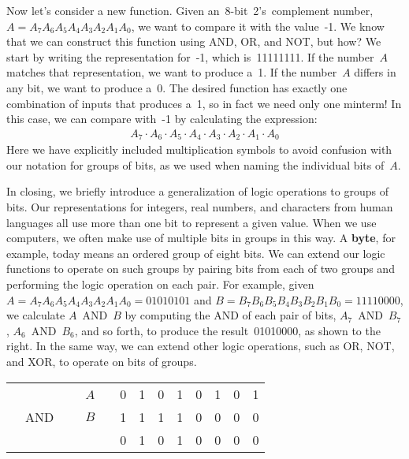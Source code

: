 Now let's consider a new function.  Given
an~\mbox{8-bit}~2's~complement number,~$A=A_7A_6A_5A_4A_3A_2A_1A_0$,
we want to compare it with the value~-1.  We know that
we can construct this function using AND, OR, and NOT, but how?
We start by writing the representation for~-1, which is~11111111.
If the number~$A$ matches that representation, we want to produce a~1.
If the number~$A$ differs in any bit, we want to produce a~0.
The desired function has exactly one combination of inputs that
produces a~1, so in fact we need only one minterm!  In this case, we
can compare with~-1 by calculating the expression:
%
\begin{eqnarray*}
A_7 \cdot A_6 \cdot A_5 \cdot A_4 \cdot A_3 \cdot A_2 \cdot A_1 \cdot A_0
\end{eqnarray*}
%
Here we have explicitly included multiplication symbols to avoid
confusion with our notation for groups of bits, as we used when 
naming the individual bits of~$A$.

\begin{minipage}{5.05in}
In closing, we briefly introduce a generalization of logic
operations to groups of bits.  Our representations for integers,
real numbers, and characters from human languages all use more than
one bit to represent a given value.  When we use computers, we often
make use of multiple bits in groups in this way.  A {\bf byte}, for example,
today means an ordered group of eight bits.
%
We can extend our logic functions to operate on such groups by pairing
bits from each of two groups and performing the logic operation on each
pair.  For example, given
$A=A_7A_6A_5A_4A_3A_2A_1A_0=01010101$
and
$B=B_7B_6B_5B_4B_3B_2B_1B_0=11110000$, we calculate
$A$~AND~$B$ by computing the AND of each pair of bits, 
$A_7$~AND~$B_7$,
$A_6$~AND~$B_6$,
and so forth, to
produce the result~01010000, as shown to the right.
In the same way, we can extend other logic
operations, such as OR, NOT, and XOR, to operate on bits of groups.
\end{minipage}\hspace{.25in}%
\begin{minipage}{1.2in}
{\arraycolsep 0pt
\tabcolsep 0pt
\begin{tabular}{rlcccccccc}
&$A$~~& 0&1& 0&1& 0&1& 0&1\\
~~AND~~~&$B$& 1&1&1&1&0&0&0&0\\ \hline
&& 0& 1&0&1&0&0&0&0
\end{tabular}
}
\end{minipage}

\vfill

\pagebreak

